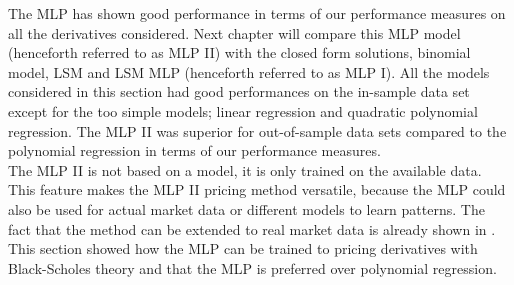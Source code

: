 The MLP has shown good performance in terms of our performance measures on all the derivatives considered. Next chapter will compare this MLP model (henceforth referred to as MLP II) with the closed form solutions, binomial model, LSM and LSM MLP (henceforth referred to as MLP I). All the models considered in this section had good performances on the in-sample data set except for the too simple models; linear regression and quadratic polynomial regression. The MLP II was superior for out-of-sample data sets compared to the polynomial regression in terms of our performance measures.\\

The MLP II is not based on a model, it is only trained on the available data. This feature makes the MLP II pricing method versatile, because the MLP could also be used for actual market data or different models to learn patterns. The fact that the method can be extended to real market data is already shown in \parencite{GasparRaquel20}. This section showed how the MLP can be trained to pricing derivatives with Black-Scholes theory and that the MLP is preferred over polynomial regression.









